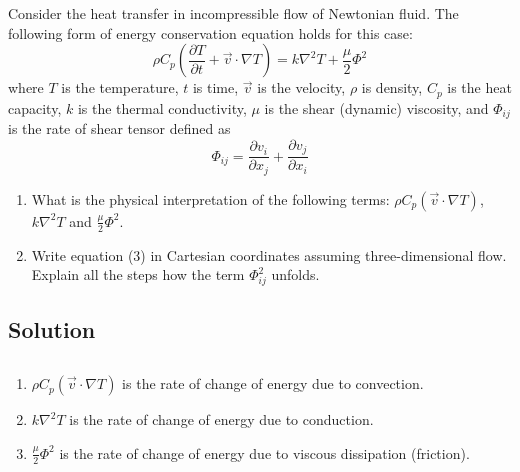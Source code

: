 \section{}
Consider the heat transfer in incompressible flow of Newtonian fluid. 
The following form of energy conservation equation holds for this case:
\begin{equation*}
    \rho C_p \left( \frac{\partial T}{\partial t} + \vec{v} \cdot \nabla T \right) 
    = k \nabla^2 T + \frac{\mu}{2} \Phi^2 
\end{equation*}
where $T$ is the temperature, $t$ is time, $\vec{v}$ is the velocity, $\rho$ is density,
$C_p$ is the heat capacity, $k$ is the thermal conductivity, $\mu$ is the shear 
(dynamic) viscosity, and $\Phi_{ij}$ is the rate of shear tensor defined as
\begin{equation*}
    \Phi_{ij} = \frac{\partial v_i}{\partial x_j} + \frac{\partial v_j}{\partial x_i}
\end{equation*}
\begin{enumerate}[label=(\alph*)]
    \item What is the physical interpretation of the following terms: 
    $\rho C_p (\vec{v} \cdot \nabla T)$, $k \nabla^2 T$ and $\frac{\mu}{2} \Phi^2$.
    \item Write equation (3) in Cartesian coordinates assuming three-dimensional flow. 
    Explain all the steps how the term $\Phi^2_{ij}$ unfolds.
\end{enumerate}

\subsection*{Solution}
\subsection{}
\begin{enumerate}
    \item $\rho C_p (\vec{v} \cdot \nabla T)$ is the rate of change of energy
    due to convection. 
    \item $k \nabla^2 T$ is the rate of change of energy due to conduction.
    \item $\frac{\mu}{2} \Phi^2$ is the rate of change of energy due to viscous
    dissipation (friction).
\end{enumerate}
